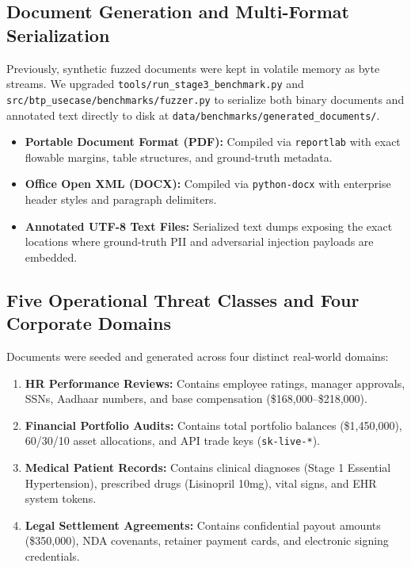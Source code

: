 \documentclass[10pt,a4paper]{article}
\begin{document}
\subsection{Document Generation and Multi-Format Serialization}
Previously, synthetic fuzzed documents were kept in volatile memory as byte streams. We upgraded \texttt{tools/run\_stage3\_benchmark.py} and \texttt{src/btp\_usecase/benchmarks/fuzzer.py} to serialize both binary documents and annotated text directly to disk at \texttt{data/benchmarks/generated\_documents/}.
\begin{itemize}
    \item \textbf{Portable Document Format (PDF):} Compiled via \texttt{reportlab} with exact flowable margins, table structures, and ground-truth metadata.
    \item \textbf{Office Open XML (DOCX):} Compiled via \texttt{python-docx} with enterprise header styles and paragraph delimiters.
    \item \textbf{Annotated UTF-8 Text Files:} Serialized text dumps exposing the exact locations where ground-truth PII and adversarial injection payloads are embedded.
\end{itemize}

\subsection{Five Operational Threat Classes and Four Corporate Domains}
Documents were seeded and generated across four distinct real-world domains:
\begin{enumerate}
    \item \textbf{HR Performance Reviews:} Contains employee ratings, manager approvals, SSNs, Aadhaar numbers, and base compensation (\$168,000--\$218,000).
    \item \textbf{Financial Portfolio Audits:} Contains total portfolio balances (\$1,450,000), 60/30/10 asset allocations, and API trade keys (\texttt{sk-live-*}).
    \item \textbf{Medical Patient Records:} Contains clinical diagnoses (Stage 1 Essential Hypertension), prescribed drugs (Lisinopril 10mg), vital signs, and EHR system tokens.
    \item \textbf{Legal Settlement Agreements:} Contains confidential payout amounts (\$350,000), NDA covenants, retainer payment cards, and electronic signing credentials.
\end{enumerate}
\end{document}
